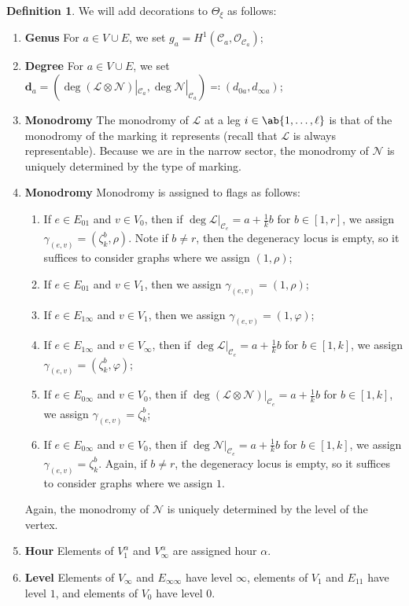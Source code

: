 \documentclass{amsart}
\theoremstyle{definition}
\newtheorem{defn}[thm]{Definition}
\theoremstyle{remark}
\theoremstyle{plain}
\theoremstyle{definition}
\theoremstyle{remark}
\newcommand{\mc}[1]{\mathcal{#1}}
\newcommand{\mbf}[1]{\mathbf{#1}}
\newcommand{\1}{\mathbf{1}}
\newcommand{\2}{\mathbf{2}}
\newcommand{\3}{\mathbf{3}}
\begin{document}
\begin{defn}\label{defn:decorations}
    We will add decorations to $\Theta_{\xi}$ as follows:
    \begin{enumerate}
        \item \textbf{Genus } For $a \in V \cup E$, we set $g_a = H^1(\mc{C}_a, \mc{O}_{\mc{C}_a})$;
        \item \textbf{Degree } For $a \in V \cup E$, we set $\mbf{d}_a = (\deg(\mc{L} \otimes \mc{N})|_{\mc{C}_a}, \deg \mc{N}|_{\mc{C}_a}) \eqqcolon (d_{0a}, d_{\infty a})$;
        \item \textbf{Monodromy } The monodromy of $\mc{L}$ at a leg $i \in \ab\{1,\ldots,\ell\}$ is that of the monodromy of the marking it represents (recall that $\mc{L}$ is always representable). Because we are in the narrow sector, the monodromy of $\mc{N}$ is uniquely determined by the type of marking.
        \item \textbf{Monodromy } Monodromy is assigned to flags as follows:
            \begin{enumerate}
                \item If $e \in E_{01}$ and $v \in V_0$, then if $\deg \mc{L}|_{\mc{C}_e} = a + \frac{1}{k}b$ for $b \in [1,r]$, we assign $\gamma_{(e,v)} = (\zeta_k^b, \rho)$. Note if $b \neq r$, then the degeneracy locus is empty, so it suffices to consider graphs where we assign $(1,\rho)$;
                \item If $e \in E_{01}$ and $v \in V_1$, then we assign $\gamma_{(e,v)} = (1, \rho)$;
                \item If $e \in E_{1\infty}$ and $v \in V_1$, then we assign $\gamma_{(e,v)} = (1, \varphi)$;
                \item If $e \in E_{1\infty}$ and $v \in V_{\infty}$, then if $\deg \mc{L}|_{\mc{C}_e} = a + \frac{1}{k}b$ for $b \in [1,k]$, we assign $\gamma_{(e,v)} = (\zeta_k^b, \varphi)$;
                \item If $e \in E_{0\infty}$ and $v \in V_0$, then if $\deg (\mc{L} \otimes \mc{N})|_{\mc{C}_e} = a + \frac{1}{k}b$ for $b \in [1,k]$, we assign $\gamma_{(e,v)} = \zeta_k^b$;
                \item If $e \in E_{0\infty}$ and $v \in V_0$, then if $\deg \mc{N}|_{\mc{C}_e} = a + \frac{1}{k}b$ for $b \in [1,k]$, we assign $\gamma_{(e,v)} = \zeta_k^b$. Again, if $b \neq r$, the degeneracy locus is empty, so it suffices to consider graphs where we assign $1$.
            \end{enumerate}
            Again, the monodromy of $\mc{N}$ is uniquely determined by the level of the vertex.
        \item \textbf{Hour } Elements of $V_1^{\alpha}$ and $V_{\infty}^{\alpha}$ are assigned hour $\alpha$.
        \item \textbf{Level } Elements of $V_{\infty}$ and $E_{\infty\infty}$ have level $\infty$, elements of $V_1$ and $E_{11}$ have level $1$, and elements of $V_0$ have level $0$.
    \end{enumerate}
\end{defn}
\end{document}
